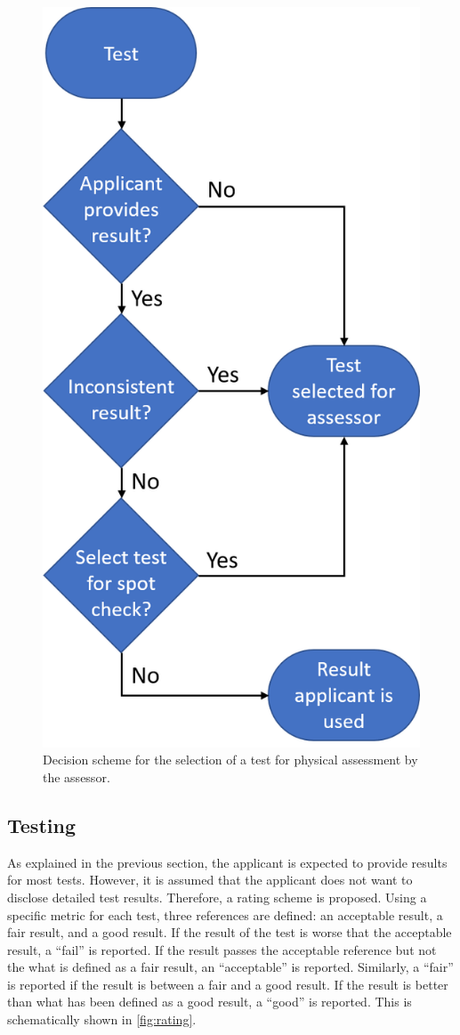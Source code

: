\begin{figure}
	\centering
	\includegraphics[width=.65\linewidth]{figures/test_selection}
	\caption{Decision scheme for the selection of a test for physical assessment by the assessor.}
	\label{fig:selection}
\end{figure}



\subsection{Testing}
\label{sec:testing}

As explained in the previous section, the applicant is expected to provide results for most tests. However, it is assumed that the applicant does not want to disclose detailed test results. Therefore, a rating scheme is proposed. Using a specific metric for each test, three references are defined: an acceptable result, a fair result, and a good result. If the result of the test is worse that the acceptable result, a ``fail'' is reported. If the result passes the acceptable reference but not the what is defined as a fair result, an ``acceptable'' is reported. Similarly, a ``fair'' is reported if the result is between a fair and a good result. If the result is better than what has been defined as a good result, a ``good'' is reported. This is schematically shown in \cref{fig:rating}. 

